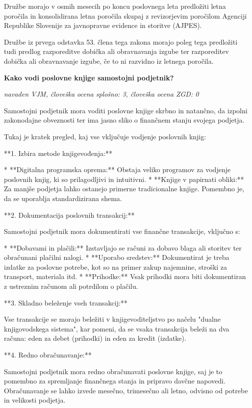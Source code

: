 \documentclass[a4paper,12pt,openright]{book}
\begin{document}
Družbe morajo v osmih mesecih po koncu poslovnega leta predložiti letna poročila in konsolidirana letna poročila skupaj z revizorjevim poročilom Agenciji Republike Slovenije za javnopravne evidence in storitve (AJPES).


Družbe iz prvega odstavka 53. člena tega zakona morajo poleg tega predložiti tudi predlog razporeditve dobička ali obravnavanja izgube ter razporeditev dobička ali obravnavanje izgube, če to ni razvidno iz letnega poročila.

\vspace{0.5cm}
\textbf{Kako vodi poslovne knjige samostojni podjetnik?}

\textit{navaden VJM, človeška ocena splošno: 3, človeška ocena ZGD: 0}

Samostojni podjetnik mora voditi poslovne knjige skrbno in natančno, da izpolni zakonodajne obveznosti ter ima jasno sliko o finančnem stanju svojega podjetja.

Tukaj je kratek pregled, kaj vse vključuje vodjenje poslovnih knjig:

**1. Izbira metode knjigevođenja:**

* **Digitalna programska oprema:** Obstaja veliko programov za vodjenje poslovnih knjig, ki so prilagodljivi in intuitivni.
* **Knjige v papirnati obliki:** Za manjše podjetja lahko ostanejo primerne tradicionalne knjige. Pomembno je, da se uporablja standardizirana shema.

**2. Dokumentacija poslovnih transakcij:**

Samostojni podjetnik mora dokumentirati vse finančne transakcije, vključno s:

* **Dobavami in plačili:** Izstavljajo se računi za dobavo blaga ali storitev ter obračunani plačilni nalogi.
* **Uporabo sredstev:**  Dokumentirat je treba izdatke za poslovne potrebe, kot so na primer zakup najemnine, stroški za transport, materiala itd.
* **Prihodke:** Vsak prihodki mora biti dokumentiran z ustreznim računom ali potrdilom o plačilu.

**3. Skladno beleženje vseh transakcij:**

Vse transakcije se morajo beležiti v knjigevoditeljstvo po načelu "dualne knjigovodskega sistema", kar pomeni, da se vsaka transakcija beleži na dva računa: eden za debet (prihodki) in eden za kredit (izdatke).

**4. Redno obračunavanje:**

Samostojni podjetnik mora redno obračunavati poslovne knjige, saj je to pomembno za spremljanje finančnega stanja in pripravo davčne napovedi. Obračunavanje se lahko izvede mesečno, trimesečno ali letno, odvisno od potrebe in velikosti podjetja.
\end{document}
